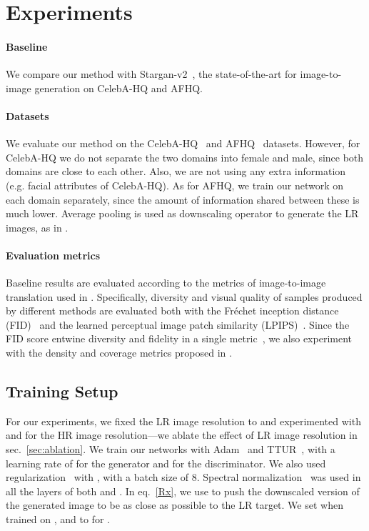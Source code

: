 \section{Experiments}

\paragraph{Baseline} We compare our method with Stargan-v2~\cite{starganv}, the state-of-the-art for image-to-image generation on CelebA-HQ and AFHQ.

\paragraph{Datasets} We evaluate our method on the CelebA-HQ~\cite{ProGanCelebA} and AFHQ~\cite{starganv} datasets. However, for CelebA-HQ we do not separate the two domains into female and male, since both domains are close to each other. Also, we are not using any extra information (e.g. facial attributes of CelebA-HQ). As for AFHQ, we train our network on each domain separately, since the amount of information shared between these is much lower. Average pooling is used as downscaling operator to generate the LR images, as in \cite{Lag}.

\paragraph{Evaluation metrics} Baseline results are evaluated according to the metrics of image-to-image translation used in \cite{MUNIT, DRIT, msgan}. Specifically, diversity and visual quality of samples produced by different methods are evaluated both with the Fréchet inception distance (FID)~\cite{ttur} and the learned perceptual image patch similarity (LPIPS)~\cite{LPIPS}. Since the FID score entwine diversity and fidelity in a single metric~\cite{divCov,precRecal}, we also experiment with the density and coverage metrics proposed in \cite{divCov}.


\subsection{Training Setup}

For our experiments, we fixed the LR image resolution to  and experimented with  and  for the HR image resolution---we ablate the effect of LR image resolution in sec.~\ref{sec:ablation}. 
We train our networks with Adam~\cite{adam} and TTUR~\cite{ttur}, with a learning rate of  for the generator and  for the discriminator. We also used  regularization~\cite{Greg} with , with a batch size of 8. Spectral normalization~\cite{spectralNorm} was used in all the layers of both  and . In eq.~\ref{Rx}, we use  to push the downscaled version of the generated image to be as close as possible to the LR target. We set  when trained on , and to  for .


